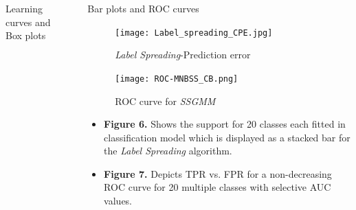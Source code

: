 \documentclass[final]{beamer}
\newlength{\sepwidth}
\newlength{\colwidth}
\newcommand{\separatorcolumn}{\begin{column}{\sepwidth}\end{column}}
\begin{document}
\begin{frame}[t]
\begin{columns}[t]
\begin{column}{\colwidth}
\begin{block}{Learning curves and Box plots}
  \end{block}

\end{column}

\separatorcolumn

\begin{column}{\colwidth}

  \begin{block}{Bar plots and ROC curves}

    \begin{figure}[ht]
    \begin{minipage}[b]{.40\textwidth}
    \centering
    \texttt{[image: Label\_spreading\_CPE.jpg]}
    \caption{\textit{Label Spreading}-Prediction error}
    \label{fig:label-spreading-CPE}
    \end{minipage}\qquad
    \begin{minipage}[b]{.40\textwidth}
    \centering
    \texttt{[image: ROC-MNBSS\_CB.png]}
    \caption{ROC curve for \textit{SSGMM}}
    \label{fig:roc-SSGMM}
    \end{minipage}
    \end{figure} 

    \begin{itemize}
        \item \textbf{Figure 6.} Shows the support for 20 classes each fitted in  classification model which is displayed as a stacked bar for the \textit{Label Spreading} algorithm. 
        \item \textbf{Figure 7.} Depicts TPR vs. FPR for a non-decreasing ROC curve for 20 multiple classes with selective AUC values.  
    \end{itemize} 






\end{block}
\end{column}
\end{columns}
\end{frame}
\end{document}
